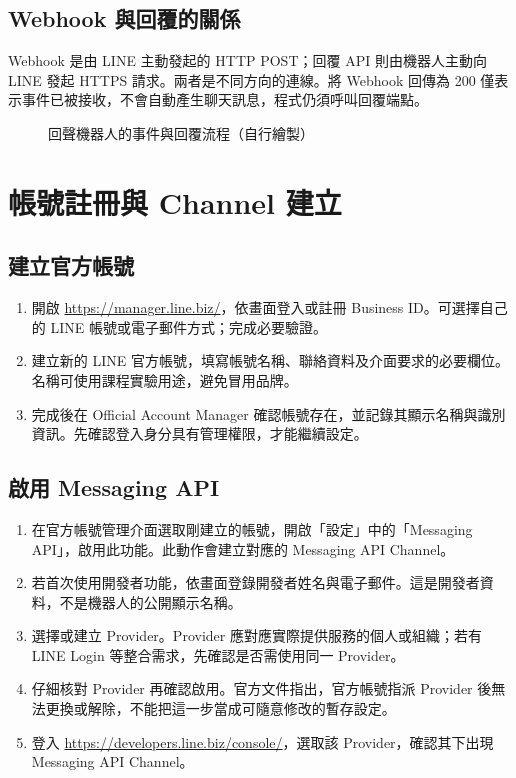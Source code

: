 \documentclass[12pt,a4paper]{report}
\begin{document}
\section{Webhook 與回覆的關係}
Webhook 是由 LINE 主動發起的 HTTP POST；回覆 API 則由機器人主動向 LINE 發起 HTTPS 請求。兩者是不同方向的連線。將 Webhook 回傳為 200 僅表示事件已被接收，不會自動產生聊天訊息，程式仍須呼叫回覆端點。
\begin{figure}[htbp]
\centering
{}
\caption{回聲機器人的事件與回覆流程（自行繪製）}\label{fig:flow}
\end{figure}
\clearpage
\chapter{帳號註冊與 Channel 建立}
\section{建立官方帳號}
\begin{enumerate}
\item 開啟 \url{https://manager.line.biz/}，依畫面登入或註冊 Business ID。可選擇自己的 LINE 帳號或電子郵件方式；完成必要驗證。
\item 建立新的 LINE 官方帳號，填寫帳號名稱、聯絡資料及介面要求的必要欄位。名稱可使用課程實驗用途，避免冒用品牌。
\item 完成後在 Official Account Manager 確認帳號存在，並記錄其顯示名稱與識別資訊。先確認登入身分具有管理權限，才能繼續設定。
\end{enumerate}
\section{啟用 Messaging API}
\begin{enumerate}
\item 在官方帳號管理介面選取剛建立的帳號，開啟「設定」中的「Messaging API」，啟用此功能。此動作會建立對應的 Messaging API Channel。
\item 若首次使用開發者功能，依畫面登錄開發者姓名與電子郵件。這是開發者資料，不是機器人的公開顯示名稱。
\item 選擇或建立 Provider。Provider 應對應實際提供服務的個人或組織；若有 LINE Login 等整合需求，先確認是否需使用同一 Provider。
\item 仔細核對 Provider 再確認啟用。官方文件指出，官方帳號指派 Provider 後無法更換或解除，不能把這一步當成可隨意修改的暫存設定。
\item 登入 \url{https://developers.line.biz/console/}，選取該 Provider，確認其下出現 Messaging API Channel。
\end{enumerate}
\end{document}
